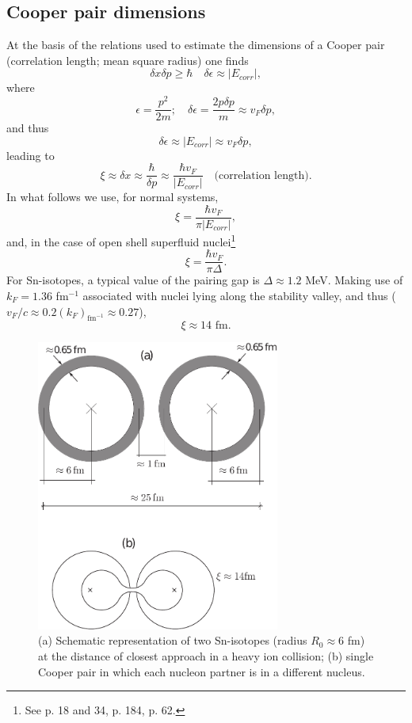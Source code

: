 \subsection{Cooper pair dimensions}\label{S3.4.1}
 At the basis of the relations used to estimate  the dimensions of a Cooper pair (correlation length; mean square radius) one finds 
\begin{equation}
\delta x\delta p\ge \hbar\quad \delta\epsilon\approx |E_{corr}|,
\end{equation}
where
\begin{equation}
\epsilon=\frac{p^2}{2m};\quad\delta\epsilon=\frac{2p\delta p}{m}\approx v_F\delta p,
\end{equation}
and thus 
\begin{equation}
\delta\epsilon\approx  |E_{corr}|\approx v_F\delta p,
\end{equation}
leading to
\begin{equation}\label{eq3.4.9}
\xi\approx\delta x\approx\frac{\hbar}{\delta p}\approx \frac{\hbar v_F}{ |E_{corr}|}\quad \text{(correlation length)}.
\end{equation}
In what follows we use, for normal systems, 
\begin{equation}
\xi=\frac{\hbar v_F}{ \pi|E_{corr}|},
\end{equation}
and, in the case of open shell superfluid nuclei\footnote{See \cite{Schrieffer:64} p. 18 and 34, \cite{Leggett:06} p. 184, \cite{Annett:13} p. 62.}
\begin{equation}\label{eq4.5.11}
\xi=\frac{\hbar v_F}{ \pi\Delta}.
\end{equation}
For Sn-isotopes, a typical value of the pairing gap is $\Delta\approx 1.2$ MeV. Making use of $k_F=1.36$ fm$^{-1}$ associated with nuclei lying along the stability valley, and thus ($v_F/c\approx 0.2 (k_F)_{\text{fm}^{-1}}\approx0.27$),
\begin{equation}
\xi\approx14\text{ fm}.
\end{equation}
\begin{figure}
\centerline{\includegraphics*[width=8cm,angle=0]{nutshell/figs/fig_1v2.pdf}}
\caption{(a) Schematic representation of two Sn-isotopes (radius $R_0\approx 6$ fm) at the distance of closest approach in a heavy ion collision; (b) single Cooper pair in which each nucleon partner is in a different nucleus.}\label{fig_1}
\end{figure}


